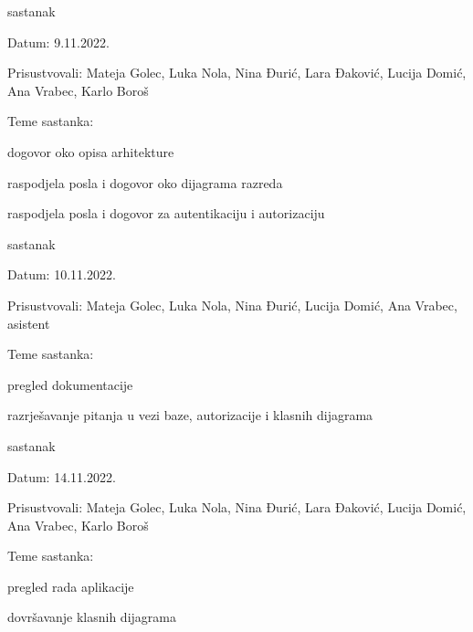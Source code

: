 \begin{packed_enum}
			\item  sastanak
			\item[] \begin{packed_item}
				\item Datum: 9.11.2022.
				\item Prisustvovali: Mateja Golec, Luka Nola, Nina Đurić, Lara Đaković, Lucija Domić, Ana Vrabec, Karlo Boroš
				\item Teme sastanka:
				\begin{packed_item}
					\item  dogovor oko opisa arhitekture
					\item  raspodjela posla i dogovor oko dijagrama razreda
					\item  raspodjela posla i dogovor za autentikaciju i autorizaciju
				\end{packed_item}
			\end{packed_item}

			\item  sastanak
			\item[] \begin{packed_item}
				\item Datum: 10.11.2022.
				\item Prisustvovali: Mateja Golec, Luka Nola, Nina Đurić, Lucija Domić, Ana Vrabec, asistent
				\item Teme sastanka:
				\begin{packed_item}
					\item  pregled dokumentacije
					\item  razrješavanje pitanja u vezi baze,  autorizacije i klasnih dijagrama
				\end{packed_item}
			\end{packed_item}

			\item  sastanak
			\item[] \begin{packed_item}
				\item Datum: 14.11.2022.
				\item Prisustvovali: Mateja Golec, Luka Nola, Nina Đurić, Lara Đaković, Lucija Domić, Ana Vrabec, Karlo Boroš
				\item Teme sastanka:
				\begin{packed_item}
					\item  pregled rada aplikacije
					\item  dovršavanje klasnih dijagrama
				\end{packed_item}
			\end{packed_item}


\end{packed_enum}
